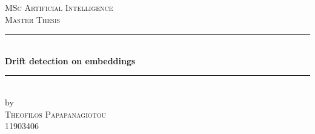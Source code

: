 \documentclass[12pt]{report}
\begin{document}
\begin{titlepage}



\newcommand{\HRule}{\rule{\linewidth}{0.5mm}}
\center

 





\textsc{\Large MSc Artificial Intelligence}\\[0.2cm]

\textsc{\Large Master Thesis}\\[0.5cm] 








\HRule \\[0.4cm]

{ \huge \bfseries Drift detection on embeddings}\\[0.4cm]

\HRule \\[0.5cm]

 






by\\[0.2cm]

\textsc{\Large Theofilos Papapanagiotou}\\[0.2cm]

{11903406}\\[1cm]











\end{titlepage}
\end{document}
